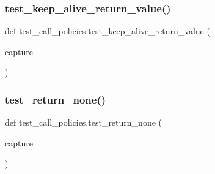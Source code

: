 \subsubsection{\texorpdfstring{test\_keep\_alive\_return\_value()}{test\_keep\_alive\_return\_value()}}
{\footnotesize\ttfamily def test\+\_\+call\+\_\+policies.\+test\+\_\+keep\+\_\+alive\+\_\+return\+\_\+value (\begin{DoxyParamCaption}\item[{}]{capture }\end{DoxyParamCaption})}

\mbox{\label{namespacetest__call__policies_a151c39309dd80a86c3a3788e2753cb2d}} 
\subsubsection{\texorpdfstring{test\_return\_none()}{test\_return\_none()}}
{\footnotesize\ttfamily def test\+\_\+call\+\_\+policies.\+test\+\_\+return\+\_\+none (\begin{DoxyParamCaption}\item[{}]{capture }\end{DoxyParamCaption})}

